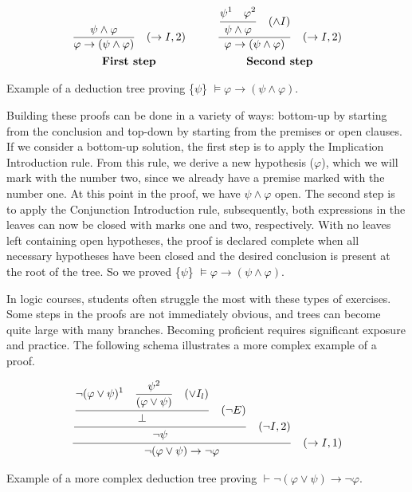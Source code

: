 \begin{table}[h!]
    \[
    \begin{array}{c@{\hspace{1cm}}c}
            \frac{\displaystyle \psi \land \varphi\strut}{\displaystyle \varphi \to (\psi \land \varphi)\strut} \quad (\to I, 2) &
            \frac{\displaystyle\frac{\displaystyle \psi^1 \quad \varphi^2\strut}{\displaystyle \psi \land \varphi\strut}\quad (\land I)\strut}{\displaystyle \varphi \to (\psi \land \varphi)\strut} \quad (\to I, 2)\\[10pt]
            \textbf{First step} & \textbf{Second step} \\
    \end{array}
      \]
    \caption{Example of a deduction tree proving \{\(\psi\)\} \( \models \varphi \to (\psi \land \varphi) \).}
    \label{tab:proof-tree-part2}
\end{table}

Building these proofs can be done in a variety of ways: bottom-up by starting from the conclusion and top-down by starting from the premises or open clauses. If we consider a bottom-up solution, the first step is to apply the Implication Introduction rule. From this rule, we derive a new hypothesis (\(\varphi\)), which we will mark with the number two, since we already have a premise marked with the number one. At this point in the proof, we have \(\displaystyle \psi \land \varphi\) open. The second step is to apply the Conjunction Introduction rule, subsequently, both expressions in the leaves can now be closed with marks one and two, respectively. With no leaves left containing open hypotheses, the proof is declared complete when all necessary hypotheses have been closed and the desired conclusion is present at the root of the tree. So we proved \{\(\psi\)\} \( \models \varphi \to (\psi \land \varphi) \).

In logic courses, students often struggle the most with these types of exercises. Some steps in the proofs are not immediately obvious, and trees can become quite large with many branches. Becoming proficient requires significant exposure and practice. The following schema illustrates a more complex example of a proof.
\begin{table}[h!]
    \centering
    \[
    \frac{\displaystyle \frac{\displaystyle \frac{
    \displaystyle \neg (\varphi \lor \psi)^1 \quad \displaystyle \frac{\psi^2}{(\varphi \lor \psi) \strut} \quad (\lor I_l) \strut}
    {\displaystyle \bot \strut} \quad (\displaystyle \neg E)\strut} {\displaystyle \neg \psi \strut} \quad (\neg I, 2) \strut}
    {\neg (\varphi \lor \psi) \to \neg \varphi \strut} \quad (\to I, 1)
    \]
    \caption{Example of a more complex deduction tree proving \( \vdash \neg (\varphi \lor \psi) \to \neg \varphi \).}
    \label{tab:proof-tree1}
\end{table}
    

